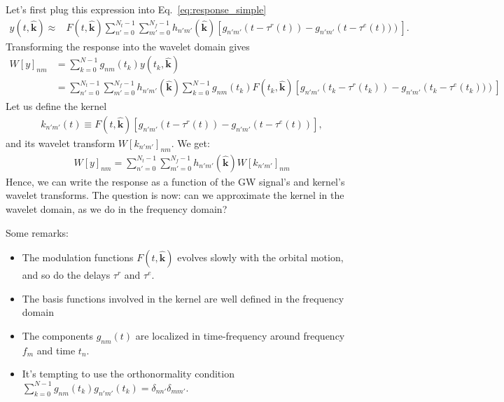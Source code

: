 \documentclass{article}
\begin{document}
Let's first plug this expression into Eq.~\eqref{eq:response_simple}
\begin{eqnarray}
\label{eq:response_simple_decomp}
y(t, \hat{\mathbf{k}}) \approx & F(t, \hat{\mathbf{k}}) \sum_{n'=0}^{N_t-1}\sum_{m'=0}^{N_f-1}h_{n'm'}(\hat{\mathbf{k}}) \left[ 
 g_{n'm'}\left(t-\tau^{r}(t)\right) -g_{n'm'}\left(t-\tau^{e}(t))\right) \right].
\end{eqnarray}
Transforming the response into the wavelet domain gives
\begin{align}
\label{response_wavelet}
W[y]_{nm} & = \sum_{k=0}^{N-1} g_{nm}(t_k) y(t_k, \hat{\mathbf{k}}) \nonumber \\
& =  \sum_{n'=0}^{N_t-1}\sum_{m'=0}^{N_f-1}h_{n'm'}(\hat{\mathbf{k}}) \sum_{k=0}^{N-1}  g_{nm}(t_k)  F(t_k, \hat{\mathbf{k}})  \left[ 
 g_{n'm'}\left(t_k-\tau^{r}(t_k)\right) -g_{n'm'}\left(t_k-\tau^{e}(t_k))\right) \right]
\end{align}
Let us define the kernel
\begin{eqnarray}
\label{eq:kernel_def}
    k_{n'm'}(t) \equiv F(t, \hat{\mathbf{k}})  \left[ 
 g_{n'm'}\left(t-\tau^{r}(t)\right) -g_{n'm'}\left(t-\tau^{e}(t)\right) \right],
\end{eqnarray}
and its wavelet transform $W[k_{n'm'}]_{nm}$. We get:
\begin{align}
\label{response_wavelet_2}
W[y]_{nm} = \sum_{n'=0}^{N_t-1}\sum_{m'=0}^{N_f-1}h_{n'm'}(\hat{\mathbf{k}}) W[k_{n'm'}]_{nm}
\end{align}
Hence, we can write the response as a function of the GW signal's and kernel's wavelet transforms. The question is now: can we approximate the kernel in the wavelet domain, as we do in the frequency domain?

Some remarks:
\begin{itemize}
    \item The modulation functions $F(t, \hat{\mathbf{k}})$ evolves slowly with the orbital motion, and so do the delays $\tau^{r}$ and $\tau^{e}$.
    \item The basis functions involved in the kernel are well defined in the frequency domain \item The components $g_{nm}(t)$ are localized in time-frequency around frequency $f_m$ and time $t_n$.
    \item It's tempting to use the orthonormality condition $\sum_{k=0}^{N-1}g_{nm}(t_k)g_{n'm'}(t_k) = \delta_{nn'}\delta_{mm'}$.
\end{itemize}
\end{document}
